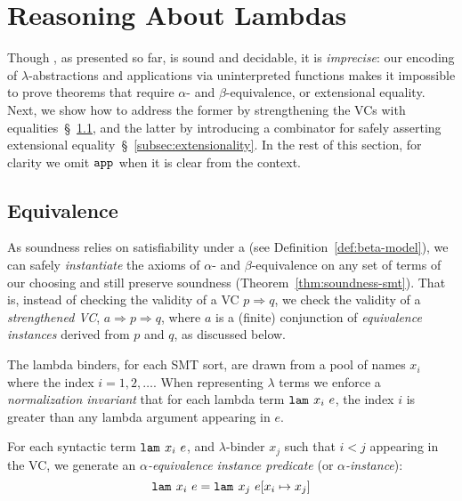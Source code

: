
\section{Reasoning About Lambdas}\label{sec:lambdas}


Though \smtlan, as presented so far, is sound and decidable,
it is \emph{imprecise}: our encoding of $\lambda$-abstractions
and applications via uninterpreted functions makes it impossible
to prove theorems that require $\alpha$- and $\beta$-equivalence,
or extensional equality. Next, we show how to address the former
by strengthening the VCs with equalities~\S~\ref{subsec:equivalences},
and the latter by introducing a combinator for safely asserting
extensional equality~\S~\ref{subsec:extensionality}.
%
In the rest of this section, 
for clarity we omit $\texttt{app}^{}_{}$ when it is clear from the context.

\subsection{Equivalence}\label{subsec:equivalences}

As soundness relies on satisfiability under a
\bmodel  (see Definition~\ref{def:beta-model}),
we can safely \emph{instantiate} the axioms of
$\alpha$- and $\beta$-equivalence on any set of
terms of our choosing and still preserve soundness
(Theorem~\ref{thm:soundness-smt}).
%
That is, instead of checking the validity
of a VC
${p \Rightarrow q}$,
we check the validity of a \emph{strengthened VC},
${a \Rightarrow p \Rightarrow q}$,
where $a$ is a (finite) conjunction
of \emph{equivalence instances}
derived from $p$ and $q$,
as discussed below.


%
The lambda binders,
for each SMT sort, are drawn from a
pool of names $x_i$ where the index
$i=1,2,\ldots$.
%
When representing
$\lambda$ terms we enforce
a \emph{normalization invariant}
that for each lambda term
$\texttt{lam}^{}_{}\ {x_i}\ {e}$, the index $i$
is greater than any lambda
argument appearing in $e$.

For each syntactic term
${\texttt{lam}^{}_{}\ {x_i}\ {e}}$, and $\lambda$-binder
$x_j$ such that $i < j$ appearing in the VC,
we generate an \emph{$\alpha$-equivalence instance predicate}
(or \emph{$\alpha$-instance}):
$$\texttt{lam}^{}_{}\ {x_i}\ {e} = \texttt{lam}^{}_{}\ {x_j}\ {e [{{x_i} \mapsto {x_j}}]}$$

